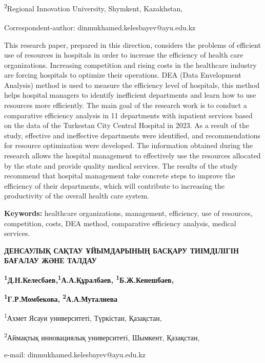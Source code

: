 \textsuperscript{2}Regional Innovation University, Shymkent, Kazakhstan,

{\bfseries \textsuperscript{\envelope }}Correspondent-author:
dinmukhamed.kelesbayev@ayu.edu.kz

This research paper, prepared in this direction, considers the problems
of efficient use of resources in hospitals in order to increase the
efficiency of health care organizations. Increasing competition and
rising costs in the healthcare industry are forcing hospitals to
optimize their operations. DEA (Data Envelopment Analysis) method is
used to measure the efficiency level of hospitals, this method helps
hospital managers to identify inefficient departments and learn how to
use resources more efficiently. The main goal of the research work is to
conduct a comparative efficiency analysis in 11 departments with
inpatient services based on the data of the Turkestan City Central
Hospital in 2023. As a result of the study, effective and ineffective
departments were identified, and recommendations for resource
optimization were developed. The information obtained during the
research allows the hospital management to effectively use the resources
allocated by the state and provide quality medical services. The results
of the study recommend that hospital management take concrete steps to
improve the efficiency of their departments, which will contribute to
increasing the productivity of the overall health care system.

{\bfseries Keywords:} healthcare organizations, management, efficiency, use
of resources, competition, costs, DEA method, comparative efficiency
analysis, medical services.

{\bfseries ДЕНСАУЛЫҚ САҚТАУ ҰЙЫМДАРЫНЫҢ БАСҚАРУ ТИІМДІЛІГІН БАҒАЛАУ ЖӘНЕ
ТАЛДАУ}

{\bfseries \textsuperscript{1}Д.Н.Келесбаев\textsuperscript{\envelope },\textsuperscript{1}А.А.Құралбаев,
\textsuperscript{1}Б.Ж.Кенешбаев,}

{\bfseries \textsuperscript{1}Г.Р.Момбекова,
\textsuperscript{2}А.А.Муталиева}

\textsuperscript{1}Ахмет Ясауи университеті, Түркістан, Қазақстан,

\textsuperscript{2}Аймақтық инновациялық университеті, Шымкент,
Қазақстан,

e-mail: dinmukhamed.kelesbayev@ayu.edu.kz

